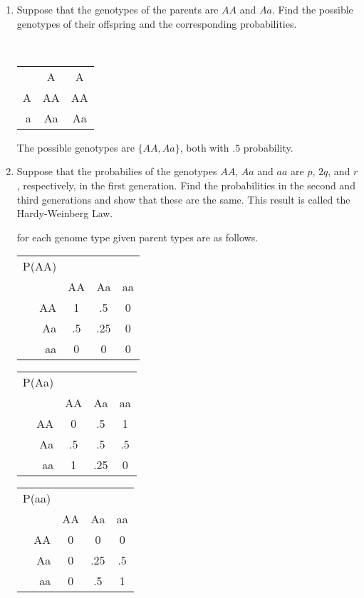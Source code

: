 \documentclass{tufte-book}
\theoremstyle{mytheoremstyle}
\theoremstyle{mylemstyle}
\theoremstyle{mydefstyle}
\begin{document}
\begin{enumerate}
\item Suppose that the genotypes of the parents are $AA$ and $Aa$. Find the possible genotypes of their offspring and the corresponding probabilities.

\\
\begin{tabular}{ r|c|c| }
\multicolumn{1}{r}{}
 &  \multicolumn{1}{c}{A}
 & \multicolumn{1}{c}{A} \\
\cline{2-3}
A & AA & AA \\
\cline{2-3}
a & Aa & Aa \\
\cline{2-3}
\end{tabular}

The possible genotypes are $\{AA, Aa \}$, both with $.5$ probability.

\item Suppose that the probabilies of the genotypes $AA$, $Aa$ and $aa$ are $p$, $2q$, and $r$, respectively, in the first generation.  Find the probabilities in the second and third generations and show that these are the same.  This result is called the Hardy-Weinberg Law.

 for each genome type given parent types are as follows.

\begin{tabular}{ r|c|c|c| }
\multicolumn{1}{r}{P(AA)}\\
\multicolumn{1}{r}{}
 & \multicolumn{1}{c}{AA}
 & \multicolumn{1}{c}{Aa}
 & \multicolumn{1}{c}{aa} \\
\cline{2-4}
AA & 1 & .5 & 0 \\
\cline{2-4}
Aa & .5 & .25 & 0 \\
\cline{2-4}
aa & 0 & 0 & 0 \\
\cline{2-4}
\end{tabular}

\begin{tabular}{ r|c|c|c| }
\multicolumn{1}{r}{P(Aa)}\\
\multicolumn{1}{r}{}
 & \multicolumn{1}{c}{AA}
 & \multicolumn{1}{c}{Aa}
 & \multicolumn{1}{c}{aa} \\
\cline{2-4}
AA & 0 & .5 & 1 \\
\cline{2-4}
Aa & .5 & .5 & .5 \\
\cline{2-4}
aa & 1 & .25 & 0 \\
\cline{2-4}
\end{tabular}

\begin{tabular}{ r|c|c|c| }
\multicolumn{1}{r}{P(aa)}\\
\multicolumn{1}{r}{}
 & \multicolumn{1}{c}{AA}
 & \multicolumn{1}{c}{Aa}
 & \multicolumn{1}{c}{aa} \\
\cline{2-4}
AA & 0 & 0 & 0 \\
\cline{2-4}
Aa & 0 & .25 & .5 \\
\cline{2-4}
aa & 0 & .5 & 1 \\
\cline{2-4}
\end{tabular}


\end{enumerate}
\end{document}
